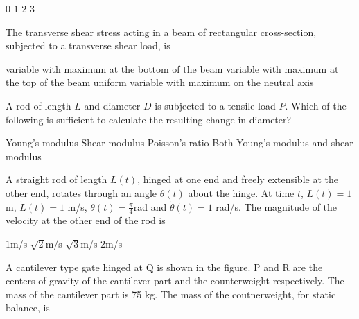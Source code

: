 \documentclass[addpoints,10pt]{exam}
\begin{document}
\begin{questions}
    \begin{oneparchoices}
        \choice $0$
        \choice $1$
        \choice $2$
        \choice $3$
    \end{oneparchoices}

    \question The transverse shear stress acting in a beam of rectangular cross-section, subjected to a transverse shear load, is

    \begin{choices}
        \choice variable with maximum at the bottom of the beam
        \choice variable with maximum at the top of the beam
        \choice uniform
        \choice variable with maximum on the neutral axis
    \end{choices}

    \question A rod of length $L$ and diameter $D$ is subjected to a tensile load $P$. Which of the following is sufficient to calculate the resulting change in diameter?

    \begin{choices}
        \choice Young's modulus
        \choice Shear modulus
        \choice Poisson's ratio
        \choice Both Young's modulus and shear modulus
    \end{choices}

    \question A straight rod of length $L(t)$, hinged at one end and freely extensible at the other end, rotates through an angle $\theta(t)$ about the hinge. At time $t$, $L(t)=1$ m, $\dot{L}(t)=1$ m/s, $\theta(t)=\frac{\pi}{4}$rad and $\dot{\theta}(t)=1$ rad/s. The magnitude of the velocity at the other end of the rod is

    \begin{oneparchoices}
        \choice $1$m/s
        \choice $\sqrt{2}$m/s
        \choice $\sqrt{3}$m/s
        \choice $2$m/s
    \end{oneparchoices}
    \pagebreak

    \question A cantilever type gate hinged at Q is shown in the figure. P and R are the centers of gravity of the cantilever part and the counterweight respectively. The mass of the cantilever part is 75 kg. The mass of the coutnerweight, for static balance, is



\end{questions}
\end{document}
